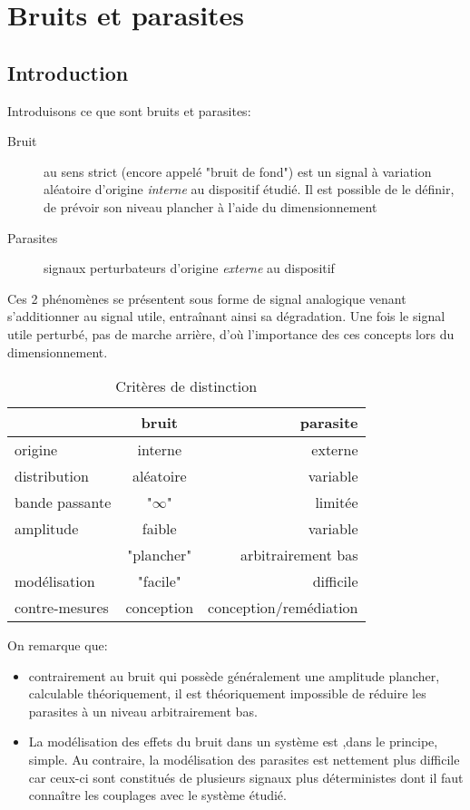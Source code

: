 \chapter{Bruits et parasites}
\section{Introduction}
Introduisons ce que sont bruits et parasites:
\begin{description}
	\item[Bruit] au sens strict (encore appelé "bruit de fond") est un signal à variation aléatoire d'origine \emph{interne} au dispositif étudié. Il est possible de le définir, de prévoir son niveau plancher à l'aide du dimensionnement
	\item[Parasites] signaux perturbateurs d'origine \emph{externe} au dispositif
\end{description}
Ces 2 phénomènes se présentent sous forme de signal analogique venant s'additionner au signal utile, entraînant ainsi sa dégradation. Une fois le signal utile perturbé, pas de marche arrière, d'où l'importance des ces concepts lors du dimensionnement.
\begin{table}[H]
	\centering
	\begin{tabular}{lcr}
		& \textbf{bruit} & \textbf{parasite} \\ \hline
		origine & interne & externe \\
		distribution & aléatoire & variable \\
		bande passante & "$\infty$" & limitée \\
		amplitude & faible & variable \\
		& "plancher" & arbitrairement bas \\
		modélisation & "facile" & difficile \\
		contre-mesures & conception & conception/remédiation \\ \hline
 	\end{tabular}
	\caption{Critères de distinction}
\end{table}
On remarque que:
\begin{itemize}
	\item contrairement au bruit qui possède généralement une amplitude plancher, calculable théoriquement, il est théoriquement impossible de réduire les parasites à un niveau arbitrairement bas.
	\item La modélisation des effets du bruit dans un système est ,dans le principe, simple. Au contraire, la modélisation des parasites est nettement plus difficile car ceux-ci sont constitués de plusieurs signaux plus déterministes dont il faut connaître les couplages avec le système étudié.
\end{itemize}
